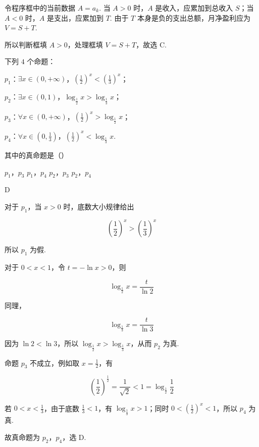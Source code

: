 \begin{solution}
令程序框中的当前数据 \(A=a_k\). 当 \(A>0\) 时，\(A\) 是收入，应累加到总收入 \(S\)；当 \(A<0\) 时，\(A\) 是支出，应累加到 \(T\). 由于 \(T\) 本身是负的支出总额，月净盈利应为 \(V=S+T\).

所以判断框填 \(A>0\)，处理框填 \(V=S+T\)，故选 C.
\end{solution}

\begin{problem}
下列 \(4\) 个命题：

\begin{circlelist}
\item \(p_1\)：\(\exists x \in (0, +\infty)\)，\(\left(\frac{1}{2}\right)^x < \left(\frac{1}{3}\right)^x\)；
\item \(p_2\)：\(\exists x \in (0,1)\)，\(\log_{\frac12} x > \log_{\frac13} x\)；
\item \(p_3\)：\(\forall x \in (0, +\infty)\)，\(\left(\frac{1}{2}\right)^x > \log_{\frac12} x\)；
\item \(p_4\)：\(\forall x \in \left(0,\frac{1}{3}\right)\)，\(\left(\frac{1}{2}\right)^x < \log_{\frac13} x\).
\end{circlelist}
其中的真命题是（\quad）

\choices
    {\(p_1\)，\(p_3\)}
    {\(p_1\)，\(p_4\)}
    {\(p_2\)，\(p_3\)}
    {\(p_2\)，\(p_4\)}
\end{problem}

\begin{answer}
    D
\end{answer}

\begin{solution}
对于 \(p_1\)，当 \(x>0\) 时，底数大小规律给出

\[
\left(\frac12\right)^x>\left(\frac13\right)^x
\]

所以 \(p_1\) 为假.

对于 \(0<x<1\)，令 \(t=-\ln x>0\)，则

\[
\log_{\frac12}x=\frac{t}{\ln2}
\]

同理，

\[
\log_{\frac13}x=\frac{t}{\ln3}
\]

因为 \(\ln2<\ln3\)，所以 \(\log_{\frac12}x>\log_{\frac13}x\)，从而 \(p_2\) 为真.

命题 \(p_3\) 不成立，例如取 \(x=\frac12\)，有

\[
\left(\frac12\right)^{\frac12}=\frac1{\sqrt2}<1=\log_{\frac12}\frac12
\]

若 \(0<x<\frac13\)，由于底数 \(\frac13<1\)，有 \(\log_{\frac13}x>1\)；同时 \(0<\left(\frac12\right)^x<1\)，所以 \(p_4\) 为真.

故真命题为 \(p_2\)，\(p_4\)，选 D.
\end{solution}

